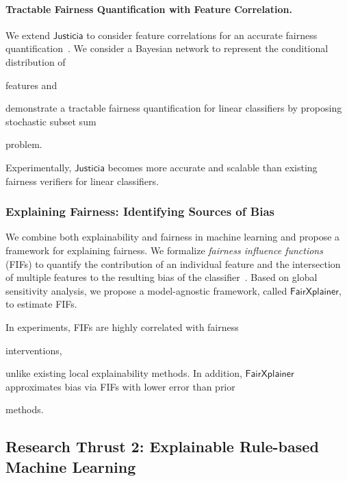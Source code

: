 \documentclass[10pt]{article}
\newif\iflongproposal
\begin{document}
	
	\paragraph{Tractable Fairness Quantification with Feature Correlation.} We extend $\mathsf{Justicia}$ to consider feature correlations for an accurate fairness quantification~\cite{ghosh2022algorithmic}. We consider a Bayesian network to represent the conditional distribution of 
	\iflongproposal
	features\textemdash the SSAT formula grows with the complexity of the Bayesian network, calling for a more scalable solution.	Therefore, we
	\else
	features and
	\fi
	demonstrate a tractable fairness quantification for linear classifiers by proposing stochastic subset sum 
	\iflongproposal
	problem, which admits an efficient dynamic programming solution with pseudo-polynomial complexity.
	\else
	problem.
	\fi 
	Experimentally, $\mathsf{Justicia}$ becomes more accurate and scalable than existing fairness verifiers for linear classifiers.
	
	
	
	
	
	\subsubsection*{Explaining Fairness: Identifying Sources of Bias}
	We combine both explainability and fairness in machine learning and propose a framework for explaining fairness.  We formalize \textit{fairness influence functions} (FIFs) to quantify the contribution of an individual feature and the intersection of multiple features to the resulting bias of the classifier~\cite{ghosh2022how}. 	Based on global sensitivity analysis, we propose a model-agnostic framework, called $\mathsf{FairXplainer}$, to estimate FIFs. 
	\iflongproposal
	The key idea is to represent fairness metrics using the variance of predictions and apply variance decomposition to compute FIFs.
	\fi
	In experiments, FIFs are highly correlated with fairness  
	\iflongproposal
	interventions and demonstrate a higher granular explanation of unfairness through intersectional influences,
	\else 
	interventions, 
	\fi
	unlike existing local explainability methods. In addition, $\mathsf{FairXplainer}$ approximates bias via FIFs with lower error than prior 
	\iflongproposal
	methods across classifiers such as neural networks and SVMs.
	\else
	methods.
	\fi
	
	

		
	
	\subsection*{Research Thrust 2: Explainable Rule-based Machine Learning}
\end{document}
